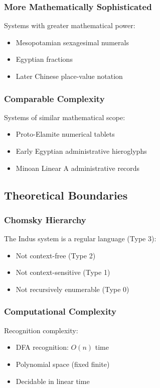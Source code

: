 \subsubsection{More Mathematically Sophisticated}
Systems with greater mathematical power:
\begin{itemize}
    \item Mesopotamian sexagesimal numerals
    \item Egyptian fractions
    \item Later Chinese place-value notation
\end{itemize}

\subsubsection{Comparable Complexity}
Systems of similar mathematical scope:
\begin{itemize}
    \item Proto-Elamite numerical tablets
    \item Early Egyptian administrative hieroglyphs
    \item Minoan Linear A administrative records
\end{itemize}

\subsection{Theoretical Boundaries}

\subsubsection{Chomsky Hierarchy}
The Indus system is a regular language (Type 3):
\begin{itemize}
    \item Not context-free (Type 2)
    \item Not context-sensitive (Type 1)
    \item Not recursively enumerable (Type 0)
\end{itemize}

\subsubsection{Computational Complexity}
Recognition complexity:
\begin{itemize}
    \item DFA recognition: $O(n)$ time
    \item Polynomial space (fixed finite)
    \item Decidable in linear time
\end{itemize}

